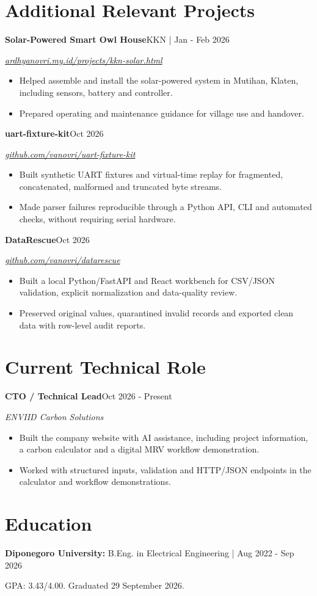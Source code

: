 \documentclass[11pt,a4paper]{article}
\newcommand{\entry}[3]{\Needspace{4\baselineskip}\textbf{#1}\hfill #2\par\textit{#3}\par}
\begin{document}
\section{Additional Relevant Projects}
\entry{Solar-Powered Smart Owl House}{KKN | Jan - Feb 2026}{\href{https://ardhyanovri.my.id/projects/kkn-solar.html}{ardhyanovri.my.id/projects/kkn-solar.html}}
\begin{itemize}
\item Helped assemble and install the solar-powered system in Mutihan, Klaten, including sensors, battery and controller.
\item Prepared operating and maintenance guidance for village use and handover.
\end{itemize}
\entry{uart-fixture-kit}{Oct 2026}{\href{https://github.com/vanovri/uart-fixture-kit}{github.com/vanovri/uart-fixture-kit}}
\begin{itemize}
\item Built synthetic UART fixtures and virtual-time replay for fragmented, concatenated, malformed and truncated byte streams.
\item Made parser failures reproducible through a Python API, CLI and automated checks, without requiring serial hardware.
\end{itemize}
\entry{DataRescue}{Oct 2026}{\href{https://github.com/vanovri/datarescue}{github.com/vanovri/datarescue}}
\begin{itemize}
\item Built a local Python/FastAPI and React workbench for CSV/JSON validation, explicit normalization and data-quality review.
\item Preserved original values, quarantined invalid records and exported clean data with row-level audit reports.
\end{itemize}
\section{Current Technical Role}
\entry{CTO / Technical Lead}{Oct 2026 - Present}{ENVIID Carbon Solutions}
\begin{itemize}
\item Built the company website with AI assistance, including project information, a carbon calculator and a digital MRV workflow demonstration.
\item Worked with structured inputs, validation and HTTP/JSON endpoints in the calculator and workflow demonstrations.
\end{itemize}
\section{Education}
\textbf{Diponegoro University:} B.Eng. in Electrical Engineering | Aug 2022 - Sep 2026\par
GPA: 3.43/4.00. Graduated 29 September 2026.
\end{document}
